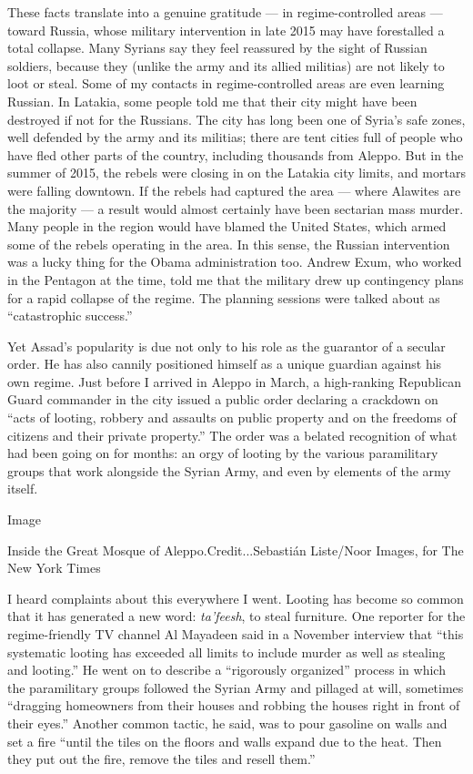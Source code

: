 These facts translate into a genuine gratitude --- in regime-controlled
areas --- toward Russia, whose military intervention in late 2015 may
have forestalled a total collapse. Many Syrians say they feel reassured
by the sight of Russian soldiers, because they (unlike the army and its
allied militias) are not likely to loot or steal. Some of my contacts in
regime-controlled areas are even learning Russian. In Latakia, some
people told me that their city might have been destroyed if not for the
Russians. The city has long been one of Syria's safe zones, well
defended by the army and its militias; there are tent cities full of
people who have fled other parts of the country, including thousands
from Aleppo. But in the summer of 2015, the rebels were closing in on
the Latakia city limits, and mortars were falling downtown. If the
rebels had captured the area --- where Alawites are the majority --- a
result would almost certainly have been sectarian mass murder. Many
people in the region would have blamed the United States, which armed
some of the rebels operating in the area. In this sense, the Russian
intervention was a lucky thing for the Obama administration too. Andrew
Exum, who worked in the Pentagon at the time, told me that the military
drew up contingency plans for a rapid collapse of the regime. The
planning sessions were talked about as ``catastrophic success.''

Yet Assad's popularity is due not only to his role as the guarantor of a
secular order. He has also cannily positioned himself as a unique
guardian against his own regime. Just before I arrived in Aleppo in
March, a high-ranking Republican Guard commander in the city issued a
public order declaring a crackdown on ``acts of looting, robbery and
assaults on public property and on the freedoms of citizens and their
private property.'' The order was a belated recognition of what had been
going on for months: an orgy of looting by the various paramilitary
groups that work alongside the Syrian Army, and even by elements of the
army itself.

Image

Inside the Great Mosque of Aleppo.Credit...Sebastián Liste/Noor Images,
for The New York Times

I heard complaints about this everywhere I went. Looting has become so
common that it has generated a new word: \emph{ta'feesh}, to steal
furniture. One reporter for the regime-friendly TV channel Al Mayadeen
said in a November interview that ``this systematic looting has exceeded
all limits to include murder as well as stealing and looting.'' He went
on to describe a ``rigorously organized'' process in which the
paramilitary groups followed the Syrian Army and pillaged at will,
sometimes ``dragging homeowners from their houses and robbing the houses
right in front of their eyes.'' Another common tactic, he said, was to
pour gasoline on walls and set a fire ``until the tiles on the floors
and walls expand due to the heat. Then they put out the fire, remove the
tiles and resell them.''

